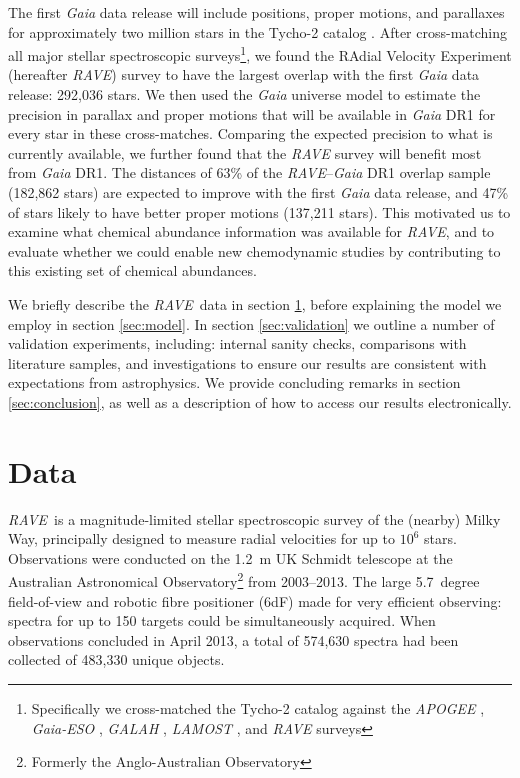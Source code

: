 \documentclass[preprint,trackchanges]{aastex}
\newcommand{\acronym}[1]{{\small{#1}}}
\newcommand{\project}[1]{\textsl{#1}}
\newcommand{\rave}{\project{\acronym{RAVE}}}
\begin{document}
The first \project{Gaia} data release will include positions, proper motions, and 
parallaxes for approximately two million stars in the Tycho-2 \citep{Hog_2000} 
catalog \citep{Michalik_2015a,Michalik_2015b}.  After cross-matching all major 
stellar spectroscopic surveys\footnote{Specifically we cross-matched the Tycho-2
catalog against the \project{APOGEE} \citep{Zasowski_2013}, \project{Gaia-ESO} 
\citep{Gilmore_2012,Randich_2013}, \project{GALAH} \citep{DeSilva_2015},
\project{LAMOST} \citep{Cui_2012}, and \project{RAVE} \citep{Steinmetz_2006} 
surveys}, we found the RAdial Velocity Experiment (hereafter \rave) survey to 
have the largest overlap with the first \project{Gaia} data release: 292,036 
stars.  We then used the \project{Gaia} universe model \citep{Robin_2012} to 
estimate the precision in parallax and proper motions that will be available in 
\project{Gaia} DR1 for every star in these cross-matches.  Comparing the expected
precision to what is currently available, we further found that the \project{RAVE}
survey will benefit most from \project{Gaia} DR1.  The distances of 63\% of the 
\project{RAVE}--\project{Gaia} DR1 overlap sample (182,862 stars) are expected to
improve with the first \project{Gaia} data release, and 47\% of stars likely to
have better proper motions (137,211 stars).  This motivated us to examine what 
chemical abundance information was available for \rave, and to evaluate whether 
we could enable new chemodynamic studies by contributing to this existing set of
chemical abundances.


We briefly describe the \rave\ data in section \ref{sec:data}, before explaining
the model we employ in section \ref{sec:model}.  In section \ref{sec:validation}
we outline a number of validation experiments, including: internal sanity checks,
comparisons with literature samples, and investigations to ensure our results
are consistent with expectations from astrophysics.  We provide concluding
remarks in section \ref{sec:conclusion}, as well as a description of how to
access our results electronically.

\section{Data}
\label{sec:data}


\rave\ is a magnitude-limited stellar spectroscopic survey of the (nearby) Milky Way,
principally designed to measure radial velocities for up to $10^6$ stars.
Observations were conducted on the 1.2~m UK Schmidt telescope at the Australian 
Astronomical Observatory\footnote{Formerly the Anglo-Australian Observatory} from 
2003--2013.  The large 5.7~degree field-of-view and robotic fibre positioner (6dF)
made for very efficient observing: spectra for up to 150 targets could be 
simultaneously acquired.  When observations concluded in April 2013, a total of 
574,630 spectra had been collected of 483,330 unique objects. 
\end{document}
